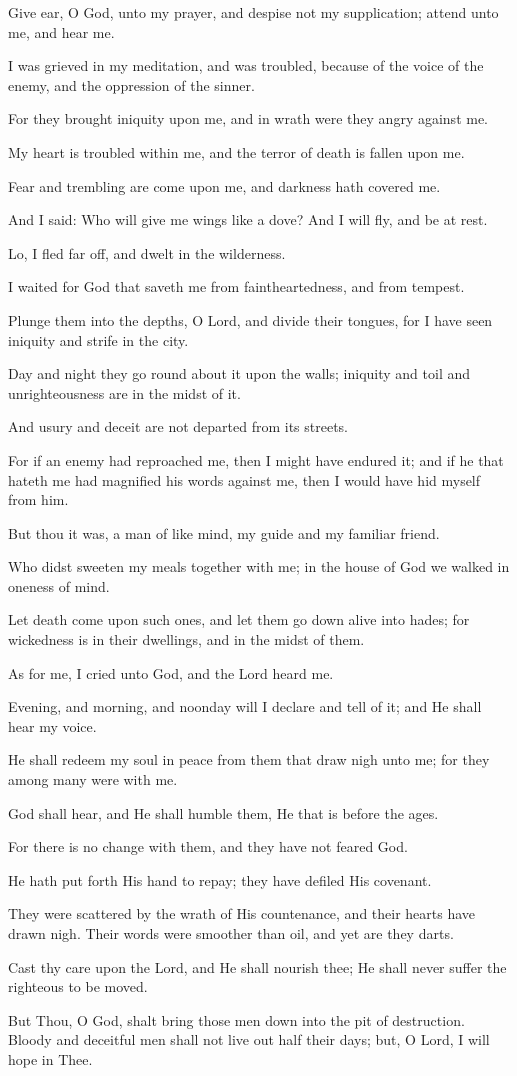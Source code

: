 Give ear, O God, unto my prayer, and despise not my supplication; attend unto me, and hear me.

I was grieved in my meditation, and was troubled, because of the voice of the enemy, and the oppression of the sinner.

For they brought iniquity upon me, and in wrath were they angry against me.

My heart is troubled within me, and the terror of death is fallen upon me.

Fear and trembling are come upon me, and darkness hath covered me.

And I said: Who will give me wings like a dove? And I will fly, and be at rest.

Lo, I fled far off, and dwelt in the wilderness.

I waited for God that saveth me from faintheartedness, and from tempest.

Plunge them into the depths, O Lord, and divide their tongues, for I have seen iniquity and strife in the city.

Day and night they go round about it upon the walls; iniquity and toil and unrighteousness are in the midst of it.

And usury and deceit are not departed from its streets.

For if an enemy had reproached me, then I might have endured it; and if he that hateth me had magnified his words against me, then I would have hid myself from him.

But thou it was, a man of like mind, my guide and my familiar friend.

Who didst sweeten my meals together with me; in the house of God we walked in oneness of mind.

Let death come upon such ones, and let them go down alive into hades; for wickedness is in their dwellings, and in the midst of them.

As for me, I cried unto God, and the Lord heard me.

Evening, and morning, and noonday will I declare and tell of it; and He shall hear my voice.

He shall redeem my soul in peace from them that draw nigh unto me; for they among many were with me.

God shall hear, and He shall humble them, He that is before the ages.

For there is no change with them, and they have not feared God.

He hath put forth His hand to repay; they have defiled His covenant.

They were scattered by the wrath of His countenance, and their hearts have drawn nigh. Their words were smoother than oil, and yet are they darts.

Cast thy care upon the Lord, and He shall nourish thee; He shall never suffer the righteous to be moved.

But Thou, O God, shalt bring those men down into the pit of destruction. Bloody and deceitful men shall not live out half their days; but, O Lord, I will hope in Thee.
